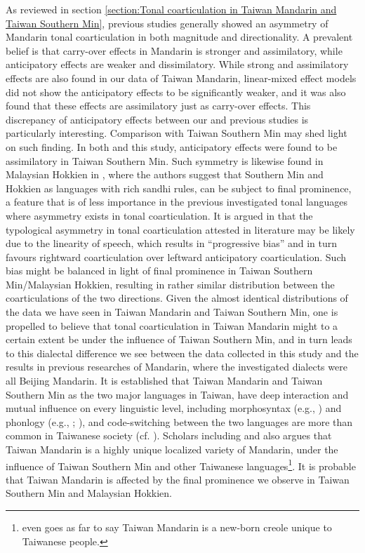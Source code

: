 \documentclass[12pt]{report}
\begin{document}
\begin{CJK}{UTF8}{bsmi}
As reviewed in section \ref{section:Tonal coarticulation in Taiwan Mandarin and Taiwan Southern Min}, previous studies generally showed an asymmetry of Mandarin tonal coarticulation in both magnitude and directionality. A prevalent belief is that carry-over effects in Mandarin is stronger and assimilatory, while anticipatory effects are weaker and dissimilatory. While strong and assimilatory effects are also found in our data of Taiwan Mandarin, linear-mixed effect models did not show the anticipatory effects to be significantly weaker, and it was also found that these effects are assimilatory just as carry-over effects. This discrepancy of anticipatory effects between our and previous studies is particularly interesting. Comparison with Taiwan Southern Min may shed light on such finding. In both \cite{Peng1997} and this study, anticipatory effects were found to be assimilatory in Taiwan Southern Min. Such symmetry is likewise found in Malaysian Hokkien in \cite{ChangHsieh2012}, where the authors suggest that Southern Min and Hokkien as languages with rich sandhi rules, can be subject to final prominence, a feature that is of less importance in the previous investigated tonal languages where asymmetry exists in tonal coarticulation. It is argued in \cite{ChangHsieh2012} that the typological asymmetry in tonal coarticulation attested in literature may be likely due to the linearity of speech, which results in ``progressive bias'' and in turn favours rightward coarticulation over leftward anticipatory coarticulation. Such bias might be balanced in light of final prominence in Taiwan Southern Min/Malaysian Hokkien, resulting in rather similar distribution between the coarticulations of the two directions. Given the almost identical distributions of the data we have seen in Taiwan Mandarin and Taiwan Southern Min, one is propelled to believe that tonal coarticulation in Taiwan Mandarin might to a certain extent be under the influence of Taiwan Southern Min, and in turn leads to this dialectal difference we see between the data collected in this study and the results in previous researches of Mandarin, where the investigated dialects were all Beijing Mandarin. It is established that Taiwan Mandarin and Taiwan Southern Min as the two major languages in Taiwan, have deep interaction and mutual influence on every linguistic level, including morphosyntax (e.g., \citealp{Li2008}) and phonlogy (e.g., \citealp{ChuangFon2010}; \citealp{Li2010}), and code-switching between the two languages are more than common in Taiwanese society (cf. \citealp{Yang2021}). Scholars including \cite{Her2012} and \cite{Su2018} also argues that Taiwan Mandarin is a highly unique localized variety of Mandarin, under the influence of Taiwan Southern Min and other Taiwanese languages\footnote{\citeauthor{Her2012} even goes as far to say Taiwan Mandarin is a new-born creole  unique to Taiwanese people.}. It is probable that Taiwan Mandarin is affected by the final prominence we observe in Taiwan Southern Min and Malaysian Hokkien.


\end{CJK}
\end{document}
